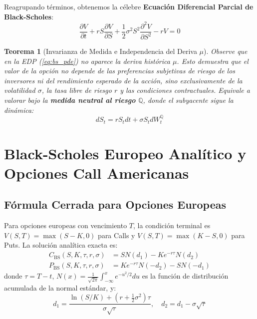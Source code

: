\documentclass[11pt,a4paper]{article}
\newtheorem{theorem}{Teorema}[section]
\begin{document}
Reagrupando términos, obtenemos la célebre \textbf{Ecuación Diferencial Parcial de Black-Scholes}:
\begin{equation}
    \label{eq:bs_pde}
    \frac{\partial V}{\partial t} + r S \frac{\partial V}{\partial S} + \frac{1}{2} \sigma^2 S^2 \frac{\partial^2 V}{\partial S^2} - r V = 0
\end{equation}
\begin{theorem}[Invarianza de Medida e Independencia del Deriva $\mu$]
Observe que en la EDP (\ref{eq:bs_pde}) no aparece la deriva histórica $\mu$. Esto demuestra que el valor de la opción no depende de las preferencias subjetivas de riesgo de los inversores ni del rendimiento esperado de la acción, sino exclusivamente de la volatilidad $\sigma$, la tasa libre de riesgo $r$ y las condiciones contractuales. Equivale a valorar bajo la \textbf{medida neutral al riesgo $\mathbb{Q}$}, donde el subyacente sigue la dinámica:
\begin{equation}
    dS_t = r S_t dt + \sigma S_t dW_t^{\mathbb{Q}}
\end{equation}
\end{theorem}

\newpage
\section{Black-Scholes Europeo Analítico y Opciones Call Americanas}

\subsection{Fórmula Cerrada para Opciones Europeas}
Para opciones europeas con vencimiento $T$, la condición terminal es $V(S, T) = \max(S - K, 0)$ para Calls y $V(S, T) = \max(K - S, 0)$ para Puts. La solución analítica exacta es:
\begin{align}
    C_{\text{BS}}(S, K, \tau, r, \sigma) &= S N(d_1) - K e^{-r\tau} N(d_2) \\
    P_{\text{BS}}(S, K, \tau, r, \sigma) &= K e^{-r\tau} N(-d_2) - S N(-d_1)
\end{align}
donde $\tau = T - t$, $N(x) = \frac{1}{\sqrt{2\pi}} \int_{-\infty}^x e^{-u^2/2} du$ es la función de distribución acumulada de la normal estándar, y:
\begin{equation}
    d_1 = \frac{\ln(S/K) + (r + \frac{1}{2}\sigma^2)\tau}{\sigma \sqrt{\tau}}, \quad d_2 = d_1 - \sigma \sqrt{\tau}
\end{equation}
\end{document}
